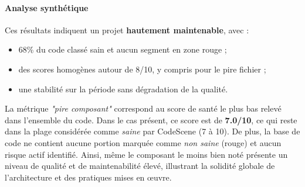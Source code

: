 \paragraph{Analyse synthétique}
Ces résultats indiquent un projet \textbf{hautement maintenable}, avec :
\begin{itemize}
    \item 68\% du code classé sain et aucun segment en zone rouge ;
    \item des scores homogènes autour de 8/10, y compris pour le pire fichier ;
    \item une stabilité sur la période sans dégradation de la qualité.
\end{itemize}

La métrique \textit{"pire composant"} correspond au score de santé le plus bas relevé dans l’ensemble du code.
Dans le cas présent, ce score est de \textbf{7.0/10}, ce qui reste dans la plage considérée comme \textit{saine} par CodeScene (7 à 10).
De plus, la base de code ne contient aucune portion marquée comme \textit{non saine} (rouge) et aucun risque actif identifié.
Ainsi, même le composant le moins bien noté présente un niveau de qualité et de maintenabilité élevé, illustrant la solidité globale de l’architecture et des pratiques mises en œuvre.